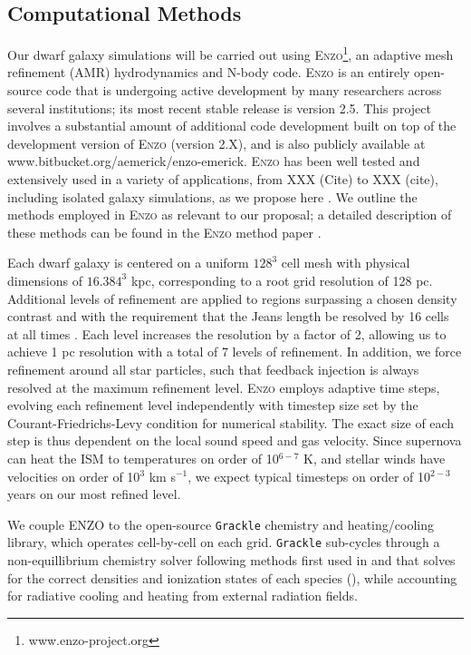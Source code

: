\documentclass[11pt]{article}
\newcommand{\eg}{e.g.,}
\begin{document}
\subsection{Computational Methods}

Our dwarf galaxy simulations will be carried out using \textsc{Enzo}\footnote{www.enzo-project.org}, an adaptive mesh refinement (AMR) hydrodynamics and N-body code. \textsc{Enzo} is an entirely open-source code that is undergoing active development by many researchers across several institutions; its most recent stable release is version 2.5. This project involves a substantial amount of additional code development built on top of the development version of \textsc{Enzo} (version 2.X), and is also publicly available at www.bitbucket.org/aemerick/enzo-emerick. \textsc{Enzo} has been well tested and extensively used in a variety of applications, from XXX (Cite) to XXX (cite), including isolated galaxy simulations, as we propose here \citep[\eg][]{Goldbaum2015, Goldbaum2016, Forbes2016}. We outline the methods employed in \textsc{Enzo} as relevant to our proposal; a detailed description of these methods can be found in the \textsc{Enzo} method paper \citep{Enzo2014}. 

Each dwarf galaxy is centered on a uniform $128^3$ cell mesh with physical dimensions of $16.384^3$ kpc, corresponding to a root grid resolution of 128 pc. Additional levels of refinement are applied to regions surpassing a chosen density contrast and with the requirement that the Jeans length be resolved by 16 cells at all times \citep{Truelove}. Each level increases the resolution by a factor of 2, allowing us to achieve 1 pc resolution with a total of 7 levels of refinement. In addition, we force refinement around all star particles, such that feedback injection is always resolved at the maximum refinement level. \textsc{Enzo} employs adaptive time steps, evolving each refinement level independently with timestep size set by the Courant-Friedrichs-Levy condition for numerical stability. The exact size of each step is thus dependent on the local sound speed and gas velocity. Since supernova can heat the ISM to temperatures on order of 10$^{6-7}$ K, and stellar winds have velocities on order of 10$^{3}$ km s$^{-1}$, we expect typical timesteps on order of 10$^{2-3}$ years on our most refined level.

We couple \textsc{ENZO} to the open-source \texttt{Grackle} chemistry and heating/cooling library, which operates cell-by-cell on each grid. \texttt{Grackle} sub-cycles through a non-equillibrium chemistry solver following methods first used in \cite{Anninos1997} and \cite{Abel1997} that solves for the correct densities and ionization states of each species (), while accounting for radiative cooling and heating from external radiation fields.
\end{document}
